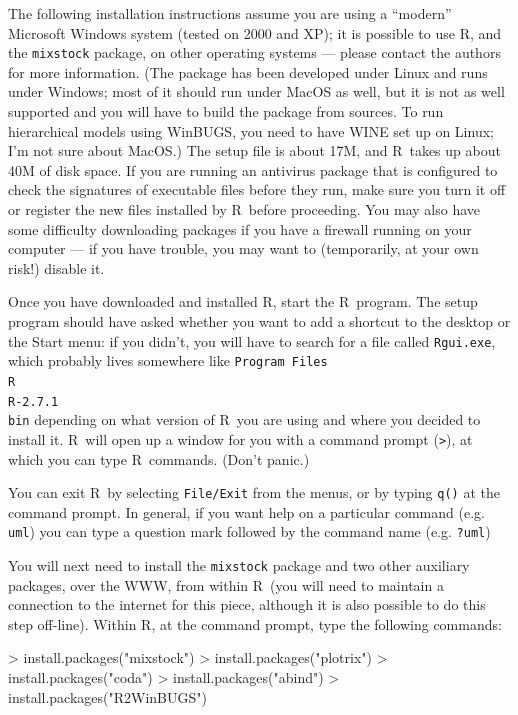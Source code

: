 \documentclass[11pt]{article}
\newcommand{\R}{{\sf R}}
\newcommand{\Rver}{2.7.1}
\begin{document}
The following installation instructions assume
you are using a ``modern'' Microsoft Windows system
(tested on 2000 and XP); it is possible to use
\R, and the {\tt mixstock} package, on other
operating systems --- please contact the
authors for more information. 
(The package has been developed under Linux and runs under
Windows; most of it should run under MacOS as well, but
it is not as well supported and you will have to build
the package from sources.   To run hierarchical models using
WinBUGS, you need to have WINE set up on Linux; I'm not
sure about MacOS.)
The setup file is about 17M, and 
\R\ takes up about 40M of disk space.
If you are running an antivirus package that is configured to check
the signatures of executable files before they run, make sure you turn
it off or register the new files installed by \R\ before proceeding.
You may also have some difficulty downloading packages if you have
a firewall running on your computer --- if you have trouble,
you may want to (temporarily, at your own risk!) disable it.

Once you have downloaded and installed \R,
start the \R\ program.  The setup program
should have asked whether you want to add a shortcut
to the desktop or the Start menu: if
you didn't, you will have to search for a file
called {\tt Rgui.exe}, which probably lives somewhere
like {\tt Program Files\\R\\R-\Rver\\bin} depending
on what version of \R\ you are using and where
you decided to install it.
\R\ will open up a window for you with a command
prompt ({\verb+>+}), at which you can type
\R\ commands.  (Don't panic.)

You can exit \R\ by selecting {\tt File/Exit} from
the menus, or by typing {\tt q()} at the command prompt.
In general, if you want help on a particular command
(e.g. {\tt uml}) you can type a question mark
followed by the command name (e.g. {\tt ?uml})

You will next need to install the {\tt mixstock}
package and two other auxiliary packages, over
the WWW, from within \R\ (you will need to
maintain a connection to the internet for this
piece, although it is also possible to do
this step off-line).
Within \R, at the command prompt, type the
following commands:
\begin{Schunk}
\begin{Sinput}
> install.packages("mixstock")
> install.packages("plotrix")
> install.packages("coda")
> install.packages("abind")
> install.packages("R2WinBUGS")
\end{Sinput}
\end{Schunk}
\end{document}
